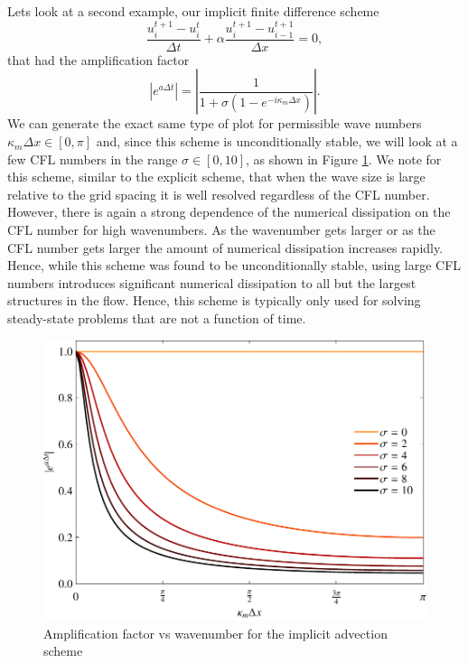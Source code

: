 Lets look at a second example, our implicit finite difference scheme
\begin{equation}
	\frac{u_i^{t+1} - u_{i}^t}{\Delta t} +  \alpha \frac{u_i^{t+1} - u_{i-1}^{t+1}}{\Delta x} = 0,
\end{equation}
that had the amplification factor
\begin{equation}
	|e^{a\Delta t}| = \left| \frac{1}{1 + \sigma \left( 1 - e^{-i \kappa_m \Delta x} \right)} \right|.
\end{equation}
We can generate the exact same type of plot for permissible wave numbers $\kappa_m \Delta x \in [0,\pi]$ and, since this scheme is unconditionally stable, we will look at a few CFL numbers in the range $\sigma \in [0,10]$, as shown in Figure \ref{fig:dissipation_advection_implicit}. We note for this scheme, similar to the explicit scheme, that when the wave size is large relative to the grid spacing it is well resolved regardless of the CFL number. However, there is again a strong dependence of the numerical dissipation on the CFL number for high wavenumbers. As the wavenumber gets larger or as the CFL number gets larger the amount of numerical dissipation increases rapidly. Hence, while this scheme was found to be unconditionally stable, using large CFL numbers introduces significant numerical dissipation to all but the largest structures in the flow. Hence, this scheme is typically only used for solving steady-state problems that are not a function of time.
\begin{figure}[htbp]
	\centering
	\includegraphics[width=0.6\linewidth]{Pictures/ch13_dissipation_adv_implct}
	\caption{Amplification factor vs wavenumber for the implicit advection scheme}
	\label{fig:dissipation_advection_implicit}
\end{figure}

